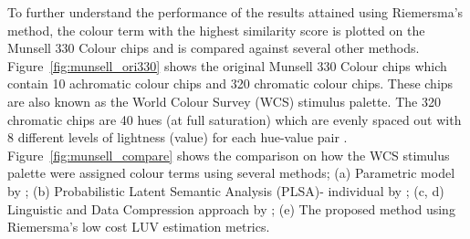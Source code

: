 




To further understand the performance of the results attained using Riemersma's method, the colour term with the highest similarity score is plotted on the Munsell 330 Colour chips and is compared against several other methods.
Figure~\ref{fig:munsell_ori330} shows the original Munsell 330 Colour chips which contain 10 achromatic colour chips and 320 chromatic colour chips.
These chips are also known as the World Colour Survey (WCS) stimulus palette.
The 320 chromatic chips are 40 hues (at full saturation) which are evenly spaced out with 8 different levels of lightness (value) for each hue-value pair \cite{kay2009world}.
Figure~\ref{fig:munsell_compare} shows the comparison on how the WCS stimulus palette were assigned colour terms using several methods; (a) Parametric model by ; (b) Probabilistic Latent Semantic Analysis (PLSA)- individual by ; (c, d) Linguistic and Data Compression approach by ; (e) The proposed method using Riemersma's low cost LUV estimation metrics.

